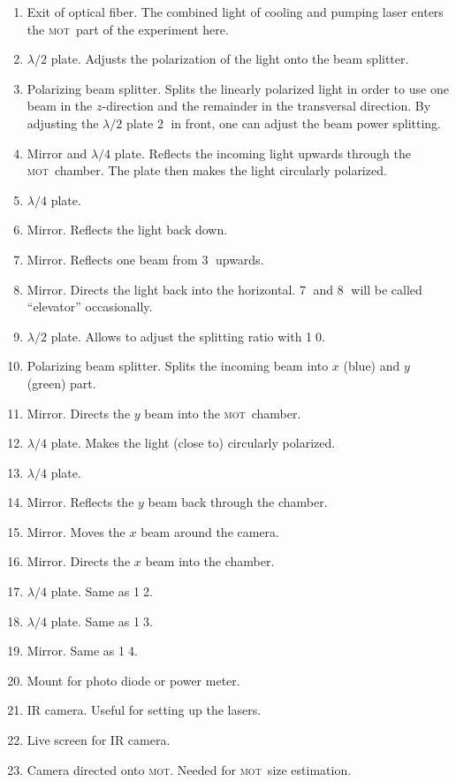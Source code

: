 \documentclass[11pt, english, fleqn, DIV=15, headinclude, BCOR=2cm]{scrreprt}
\newcommand\mot{\textsc{mot}}
\begin{document}
\begin{enumerate}
    \item
        Exit of optical fiber. The combined light of cooling and pumping
        laser enters the \mot\ part of the experiment here.
    \item
        $\lambda/2$ plate. Adjusts the polarization of the light onto the beam
        splitter.
    \item
        Polarizing beam splitter. Splits the linearly polarized light in order
        to use one beam in the $z$-direction and the remainder in the
        transversal direction. By adjusting the $\lambda/2$ plate \textcircled
        2 in front, one can adjust the beam power splitting.
    \item
        Mirror and $\lambda/4$ plate. Reflects the incoming light upwards
        through the \mot\ chamber. The plate then makes the light circularly
        polarized.
    \item
        $\lambda/4$ plate.
    \item
        Mirror. Reflects the light back down.
    \item
        Mirror. Reflects one beam from \textcircled 3 upwards.
    \item
        Mirror. Directs the light back into the horizontal. \textcircled 7 and
        \textcircled 8 will be called \enquote{elevator} occasionally.
    \item
        $\lambda/2$ plate. Allows to adjust the splitting ratio with
        \textcircled{10}.
    \item
        Polarizing beam splitter. Splits the incoming beam into $x$ (blue) and
        $y$ (green) part.
    \item
        Mirror. Directs the $y$ beam into the \mot\ chamber.
    \item
        $\lambda/4$ plate. Makes the light (close to) circularly polarized.
    \item
        $\lambda/4$ plate.
    \item
        Mirror. Reflects the $y$ beam back through the chamber.
    \item
        Mirror. Moves the $x$ beam around the camera.
    \item
        Mirror. Directs the $x$ beam into the chamber.
    \item
        $\lambda/4$ plate. Same as \textcircled{12}.
    \item
        $\lambda/4$ plate. Same as \textcircled{13}.
    \item
        Mirror. Same as \textcircled{14}.
    \item
        Mount for photo diode or power meter.
    \item
        IR camera. Useful for setting up the lasers.
    \item
        Live screen for IR camera.
    \item
        Camera directed onto \mot. Needed for \mot\ size estimation.
\end{enumerate}
\end{document}
